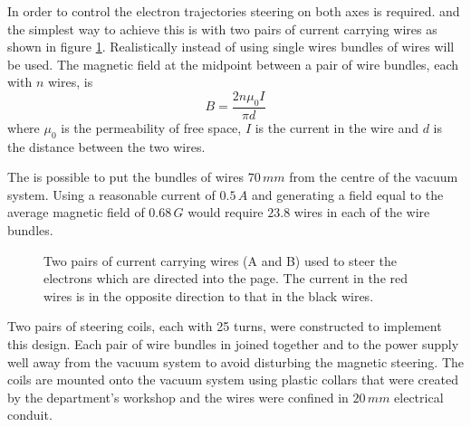 In order to control the electron trajectories steering on both axes is required. and the simplest way to achieve this is with two pairs of current carrying wires as shown in figure \ref{fig:mag_steering}. Realistically instead of using single wires bundles of wires will be used. The magnetic field at the midpoint between a pair of wire bundles, each with $n$ wires, is
\begin{equation}
B=\frac{2n\mu_0I}{\pi d}
\end{equation}
where $\mu_0$ is the permeability of free space, $I$ is the current in the wire and $d$ is the distance between the two wires.

The is possible to put the bundles of wires $70\,\unit{mm}$ from the centre of the vacuum system. Using a reasonable current of $0.5\,\unit{A}$ and generating a field equal to the average magnetic field of $0.68\,\unit{G}$ would require $23.8$ wires in each of the wire bundles.

\begin{figure}[h]
\centering
{}
\caption{Two pairs of current carrying wires (A and B) used to steer the electrons which are directed into the page. The current in the red wires is in the opposite direction to that in the black wires.}
\label{fig:mag_steering}
\end{figure}

Two pairs of steering coils, each with 25 turns, were constructed to implement this design. Each pair of wire bundles in joined together and to the power supply well away from the vacuum system to avoid disturbing the magnetic steering. The coils are mounted onto the vacuum system using plastic collars that were created by the department's workshop and the wires were confined in $20\,\unit{mm}$ electrical conduit.

